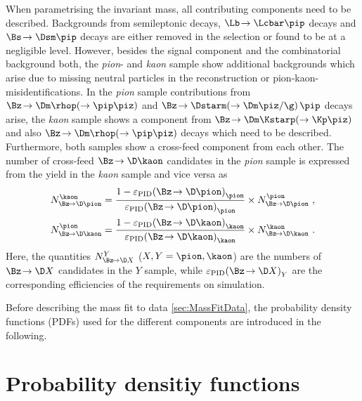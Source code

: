 When parametrising the invariant \Bz mass, all contributing components need to be described. Backgrounds from semileptonic decays, \mbox{$\Lb\!\to\Lcbar\pip$} decays and \mbox{$\Bs\!\to\Dsm\pip$} decays are either removed in the selection or found to be at a negligible level.
However, besides the signal component and the combinatorial background both, the \emph{pion}- and \emph{kaon} sample show additional backgrounds which arise due to missing neutral particles in the reconstruction or pion-kaon-misidentifications.
In the \emph{pion} sample contributions from $\Bz\!\to\Dm\rhop\!\left(\to\pip\piz\right)$ and $\Bz\!\to\Dstarm\!\left(\to\Dm\piz/\g\right)\pip$ decays arise, the \emph{kaon} sample shows a component from $\Bz\!\to\Dm\Kstarp\!\left(\to\Kp\piz\right)$ and also $\Bz\!\to\Dm\rhop\!\left(\to\pip\piz\right)$ decays which need to be described.
Furthermore, both samples show a cross-feed component from each other.
The number of cross-feed $\Bz\!\to\D\kaon$ candidates in the \emph{pion} sample is expressed from the yield in the \emph{kaon} sample and vice versa as
\begin{equation}
\begin{aligned}
N_{\Bz\!\to\D\pion}^{\kaon}&=\frac{1-\varepsilon_{\text{PID}}\!\left(\Bz\!\to\D \pion\right)_{\pion}}{\varepsilon_{\text{PID}}\!\left(\Bz\!\to\D \pion\right)_{\pion}}\times N_{\Bz\!\to\D\pion}^{\pion} \,\,,\\
N_{\Bz\!\to\D\kaon}^{\pion}&=\frac{1-\varepsilon_{\text{PID}}\!\left(\Bz\!\to\D \kaon\right)_{\kaon}}{\varepsilon_{\text{PID}}\!\left(\Bz\!\to\D \kaon\right)_{\kaon}}\times N_{\Bz\!\to\D\kaon}^{\kaon}\,\,.\label{eq:ConstrainCrossFeed}
\end{aligned}
\end{equation}
Here, the quantities $N_{\Bz\!\to\D X}^{Y}$ ($X,Y=\pion,\kaon$) are the numbers of $\Bz\!\to\D X$ candidates in the $Y$ sample, while $\varepsilon_{\text{PID}}\!\left(\Bz\!\to\D X\right)_Y$ are the corresponding efficiencies of the \dllkpi requirements on simulation.

Before describing the mass fit to data {\cref{sec:MassFitData}}, the probability density functions (PDFs) used for the different components are introduced in the following.

\section{Probability densitiy functions}
\label{sec:PDFs}

